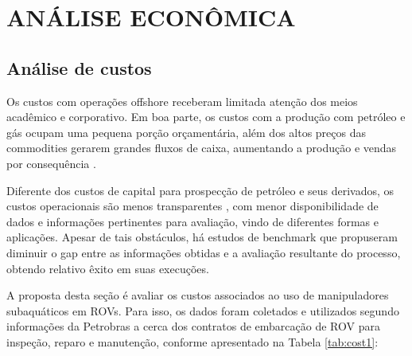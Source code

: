 \chapter{ANÁLISE ECONÔMICA}
\label{chap:rskk}

\section{Análise de custos}
\label{sec:rskconc}
Os custos com operações offshore receberam limitada atenção dos meios acadêmico e corporativo. Em boa parte, os custos com a produção com petróleo e gás ocupam uma pequena porção orçamentária, além dos altos preços das commodities gerarem grandes fluxos de caixa, aumentando a produção e vendas por consequência \cite{kaiser2019role}.

Diferente dos custos de capital para prospecção de petróleo e seus derivados, os custos operacionais são menos transparentes , com menor disponibilidade de dados e informações pertinentes para avaliação, vindo de diferentes formas e aplicações. Apesar de tais obstáculos, há estudos de benchmark que propuseram diminuir o gap entre as informações obtidas e a avaliação resultante do processo, obtendo relativo êxito em suas execuções. 

A proposta desta seção é avaliar os custos associados ao uso de manipuladores subaquáticos em ROVs. Para isso, os dados foram coletados e utilizados segundo informações da Petrobras a cerca dos contratos de embarcação de ROV para inspeção, reparo e manutenção, conforme apresentado na Tabela \ref{tab:cost1}:

